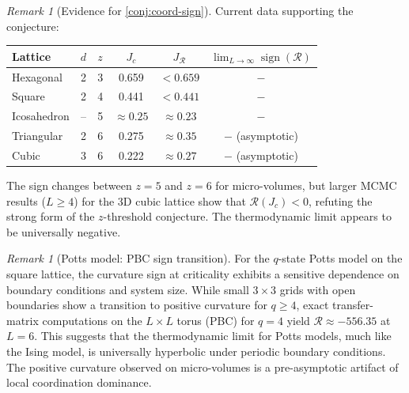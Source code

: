 \documentclass[11pt]{article}
\theoremstyle{definition}
\theoremstyle{remark}
\newtheorem{remark}[theorem]{Remark}
\newcommand{\Scal}{\mathcal{R}}
\begin{document}
\begin{remark}[Evidence for \cref{conj:coord-sign}]
\label{rem:coord-sign-evidence}
Current data supporting the conjecture:
\begin{center}
\renewcommand{\arraystretch}{1.15}
\begin{tabular}{lccccc}
\toprule
Lattice & $d$ & $z$ & $J_c$ & $J_{\Scal}$ & $\lim_{L\to\infty}\operatorname{sign}(\Scal)$ \\
\midrule
Hexagonal & 2 & 3 & 0.659 & $< 0.659$ & $-$ \\
Square & 2 & 4 & 0.441 & $< 0.441$ & $-$ \\
Icosahedron & -- & 5 & $\approx 0.25$ & $\approx 0.23$ & $-$ \\
Triangular & 2 & 6 & 0.275 & $\approx 0.35$ & $-$ (asymptotic) \\
Cubic & 3 & 6 & 0.222 & $\approx 0.27$ & $-$ (asymptotic) \\
\bottomrule
\end{tabular}
\end{center}
The sign changes between $z = 5$ and $z = 6$ for micro-volumes, but
larger MCMC results ($L \geq 4$) for the 3D cubic lattice show that
$\Scal(J_c) < 0$, refuting the strong form of the $z$-threshold
conjecture. The thermodynamic limit appears to be universally negative.
\end{remark}

\begin{remark}[Potts model: PBC sign transition]
\label{rem:potts-sign}
For the $q$-state Potts model on the square lattice, the curvature sign at
criticality exhibits a sensitive dependence on boundary conditions and
system size. While small $3 \times 3$ grids with open boundaries show
a transition to positive curvature for $q \geq 4$, exact transfer-matrix
computations on the $L \times L$ torus (PBC) for $q = 4$ yield
$\Scal \approx -556.35$ at $L = 6$. This suggests that the
thermodynamic limit for Potts models, much like the Ising model, is
universally hyperbolic under periodic boundary conditions. The positive
curvature observed on micro-volumes is a pre-asymptotic artifact of
local coordination dominance.
\end{remark}
\end{document}
